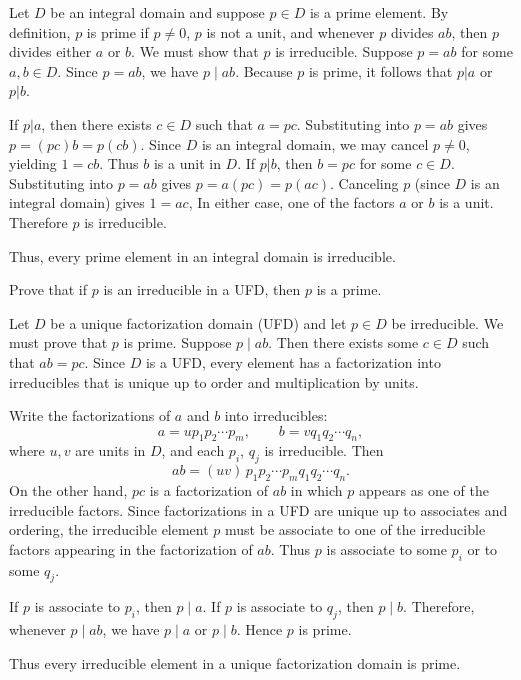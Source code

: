 \begin{solution}
  Let $D$ be an integral domain and suppose $p \in D$ is a prime element. By definition, $p$ is prime if $p \ne 0$, $p$ is not a unit, and whenever $p$ divides $ab$, then $p$ divides either $a$ or $b$. We must show that $p$ is irreducible. Suppose $p = ab$ for some $a, b \in D$. Since $p = ab$, we have $p \mid ab$. Because $p$ is prime, it follows that $p | a$ or $p | b$.

  If $p | a$, then there exists $c \in D$ such that $a = pc$. Substituting into $p = ab$ gives $p = (pc)b = p(cb)$. Since $D$ is an integral domain, we may cancel $p \neq 0$, yielding $1 = cb$. Thus $b$ is a unit in $D$. If $p | b$, then $b = pc$ for some $c \in D$. Substituting into $p = ab$ gives $p = a(pc) = p(ac)$. Canceling $p$ (since $D$ is an integral domain) gives $1 = ac$, In either case, one of the factors $a$ or $b$ is a unit. Therefore $p$ is irreducible.

  Thus, every prime element in an integral domain is irreducible.
\end{solution}

\begin{problem}[34.26]
  Prove that if $p$ is an irreducible in a UFD, then $p$ is a prime.
\end{problem}

\begin{solution}
  Let $D$ be a unique factorization domain (UFD) and let $p \in D$ be irreducible. We must prove that $p$ is prime. Suppose $p \mid ab$. Then there exists some $c \in D$ such that $ab = pc$. Since $D$ is a UFD, every element has a factorization into irreducibles that is unique up to order and multiplication by units.

  Write the factorizations of $a$ and $b$ into irreducibles:
  \[%
    a = u p_1 p_2 \cdots p_m, \qquad b = v q_1 q_2 \cdots q_n
  ,\]%
  where $u,v$ are units in $D$, and each $p_i$, $q_j$ is irreducible. Then
  \[%
    ab = (uv)\, p_1 p_2 \cdots p_m q_1 q_2 \cdots q_n
  .\]%
  On the other hand, $pc$ is a factorization of $ab$ in which $p$ appears as one of the irreducible factors. Since factorizations in a UFD are unique up to associates and ordering, the irreducible element $p$ must be associate to one of the irreducible factors appearing in the factorization of $ab$. Thus $p$ is associate to some $p_i$ or to some $q_j$.

  If $p$ is associate to $p_i$, then $p \mid a$. If $p$ is associate to $q_j$, then $p \mid b$. Therefore, whenever $p \mid ab$, we have $p \mid a$ or $p \mid b$. Hence $p$ is prime.

  Thus every irreducible element in a unique factorization domain is prime.
\end{solution}

